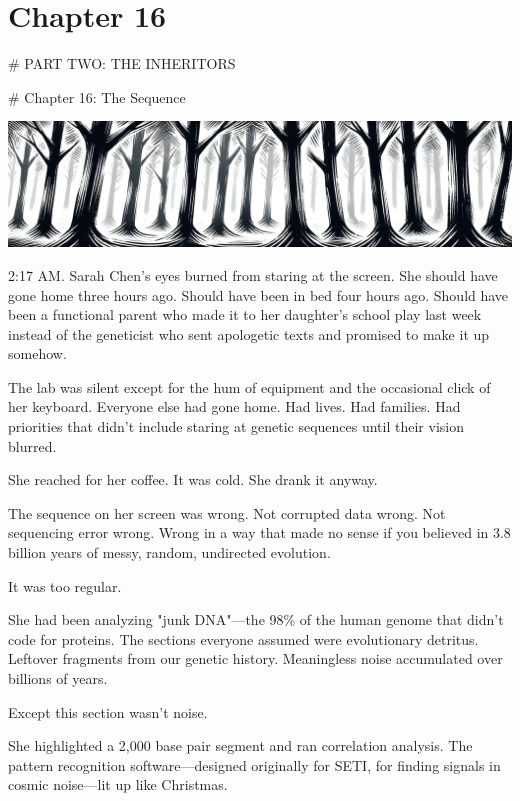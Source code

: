 \chapter{Chapter 16}
\label{ch:16}

\# PART TWO: THE INHERITORS

\# Chapter 16: The Sequence

\begin{center}
\includegraphics[width=\textwidth]{images/chapterImages/genesis_sketch_00103_.png}
\end{center}

2:17 AM. Sarah Chen's eyes burned from staring at the screen. She should have gone home three hours ago. Should have been in bed four hours ago. Should have been a functional parent who made it to her daughter's school play last week instead of the geneticist who sent apologetic texts and promised to make it up somehow.

The lab was silent except for the hum of equipment and the occasional click of her keyboard. Everyone else had gone home. Had lives. Had families. Had priorities that didn't include staring at genetic sequences until their vision blurred.

She reached for her coffee. It was cold. She drank it anyway.

The sequence on her screen was wrong. Not corrupted data wrong. Not sequencing error wrong. Wrong in a way that made no sense if you believed in 3.8 billion years of messy, random, undirected evolution.

It was too regular.

She had been analyzing "junk DNA"—the 98\% of the human genome that didn't code for proteins. The sections everyone assumed were evolutionary detritus. Leftover fragments from our genetic history. Meaningless noise accumulated over billions of years.

Except this section wasn't noise.

She highlighted a 2,000 base pair segment and ran correlation analysis. The pattern recognition software—designed originally for SETI, for finding signals in cosmic noise—lit up like Christmas.


